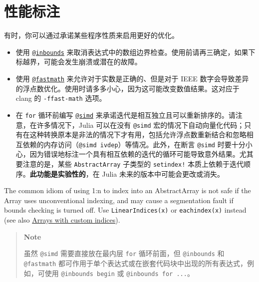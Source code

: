 \hypertarget{3688250407374776658}{}


\section{性能标注}



有时，你可以通过承诺某些程序性质来启用更好的优化。



\begin{itemize}
\item 使用 \hyperlink{9619263577270933060}{\texttt{@inbounds}} 来取消表达式中的数组边界检查。使用前请再三确定，如果下标越界，可能会发生崩溃或潜在的故障。


\item 使用 \hyperlink{8577961464469068114}{\texttt{@fastmath}} 来允许对于实数是正确的、但是对于 IEEE 数字会导致差异的浮点数优化。使用时请多多小心，因为这可能改变数值结果。这对应于 clang 的 \texttt{-ffast-math} 选项。


\item 在 \texttt{for} 循环前编写 \hyperlink{8155428559748374852}{\texttt{@simd}} 来承诺迭代是相互独立且可以重新排序的。请注意，在许多情况下，Julia 可以在没有 \texttt{@simd} 宏的情况下自动向量化代码；只有在这种转换原本是非法的情况下才有用，包括允许浮点数重新结合和忽略相互依赖的内存访问（\texttt{@simd ivdep}）等情况。此外，在断言 \texttt{@simd} 时要十分小心，因为错误地标注一个具有相互依赖的迭代的循环可能导致意外结果。尤其要注意的是，某些 \texttt{AbstractArray} 子类型的 \texttt{setindex!} 本质上依赖于迭代顺序。\textbf{此功能是实验性的}，在 Julia 未来的版本中可能会更改或消失。

\end{itemize}


The common idiom of using 1:n to index into an AbstractArray is not safe if the Array uses unconventional indexing, and may cause a segmentation fault if bounds checking is turned off. Use \texttt{LinearIndices(x)} or \texttt{eachindex(x)} instead (see also \hyperlink{1238988360302116626}{Arrays with custom indices}).



\begin{quote}
\textbf{Note}

虽然 \texttt{@simd} 需要直接放在最内层 \texttt{for} 循环前面，但 \texttt{@inbounds} 和 \texttt{@fastmath} 都可作用于单个表达式或在嵌套代码块中出现的所有表达式，例如，可使用 \texttt{@inbounds begin} 或 \texttt{@inbounds for ...}。

\end{quote}


